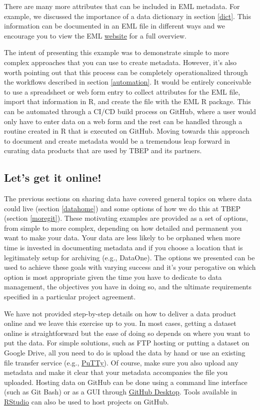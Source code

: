 \documentclass[
]{book}
\begin{document}
There are many more attributes that can be included in EML metadata. For example, we discussed the importance of a data dictionary in section \ref{dict}. This information can be documented in an EML file in different ways and we encourage you to view the EML \href{https://docs.ropensci.org/EML/}{website} for a full overview.

The intent of presenting this example was to demonstrate simple to more complex approaches that you can use to create metadata. However, it's also worth pointing out that this process can be completely operationalized through the workflows described in section \ref{automation}. It would be entirely conceivable to use a spreadsheet or web form entry to collect attributes for the EML file, import that information in R, and create the file with the EML R package. This can be automated through a CI/CD build process on GitHub, where a user would only have to enter data on a web form and the rest can be handled through a routine created in R that is executed on GitHub. Moving towards this approach to document and create metadata would be a tremendous leap forward in curating data products that are used by TBEP and its partners.

\hypertarget{lets-get-it-online}{%
\subsection{Let's get it online!}\label{lets-get-it-online}}

The previous sections on sharing data have covered general topics on where data could live (section \ref{datahome}) and some options of how we do this at TBEP (section \ref{moregit}). These motivating examples are provided as a set of options, from simple to more complex, depending on how detailed and permanent you want to make your data. Your data are less likely to be orphaned when more time is invested in documenting metadata and if you choose a location that is legitimately setup for archiving (e.g., DataOne). The options we presented can be used to achieve these goals with varying success and it's your perogative on which option is most appropriate given the time you have to dedicate to data management, the objectives you have in doing so, and the ultimate requirements specified in a particular project agreement.

We have not provided step-by-step details on how to deliver a data product online and we leave this exercise up to you. In most cases, getting a dataset online is straightforward but the ease of doing so depends on where you want to put the data. For simple solutions, such as FTP hosting or putting a dataset on Google Drive, all you need to do is upload the data by hand or use an existing file transfer service (e.g., \href{https://www.putty.org/}{PuTTy}). Of course, make sure you also upload any metadata and make it clear that your metadata accompanies the file you uploaded. Hosting data on GitHub can be done using a command line interface (such as Git Bash) or as a GUI through \href{https://desktop.github.com/}{GitHub Desktop}. Tools available in \href{https://happygitwithr.com/rstudio-git-github.html}{RStudio} can also be used to host projects on GitHub.
\end{document}
